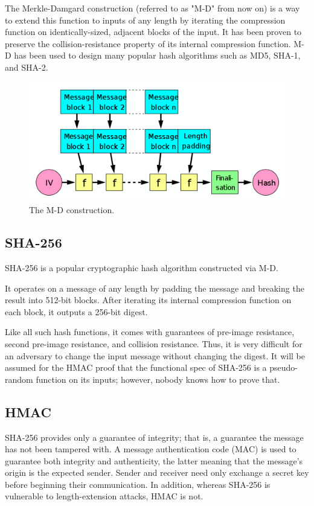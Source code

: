 \documentclass[twocolumn,showpacs,%
  nofootinbib,aps,superscriptaddress,%
  eqsecnum,prd,notitlepage,showkeys,10pt]{revtex4-1}
\begin{document}
The Merkle-Damgard construction (referred to as "M-D" from now on) is a way to extend this function to inputs of any length by iterating the compression function on identically-sized, adjacent blocks of the input. It has been proven to preserve the collision-resistance property of its internal compression function. M-D has been used to design many popular hash algorithms such as MD5, SHA-1, and SHA-2. 

\begin{figure}[h!]
	\centering
	\includegraphics[scale=0.24]{Merkle-Damgard}
	\caption{The M-D construction.}
\end{figure}

\subsection{SHA-256}

SHA-256 is a popular cryptographic hash algorithm constructed via M-D. 

It operates on a message of any length by padding the message and breaking the result into 512-bit blocks. After iterating its internal compression function on each block, it outputs a 256-bit digest. 

Like all such hash functions, it comes with guarantees of pre-image resistance, second pre-image resistance, and collision resistance. Thus, it is very difficult for an adversary to change the input message without changing the digest. It will be assumed for the HMAC proof that the functional spec of SHA-256 is a pseudo-random function on its inputs; however, nobody knows how to prove that.

\subsection{HMAC}

SHA-256 provides only a guarantee of integrity; that is, a guarantee the message has not been tampered with. A message authentication code (MAC) is used to guarantee both integrity and authenticity, the latter meaning that the message's origin is the expected sender. Sender and receiver need only exchange a secret key before beginning their communication. In addition, whereas SHA-256 is vulnerable to length-extension attacks, HMAC is not.
\end{document}
